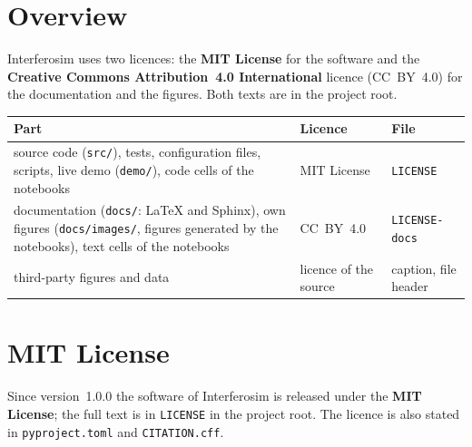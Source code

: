 \label{ch:licence}  %

\section{Overview}

Interferosim uses two licences: the \textbf{MIT License} for the
software and the \textbf{Creative Commons Attribution~4.0
International} licence (CC~BY~4.0) for the documentation and the
figures. Both texts are in the project root.\vspace{-\baselineskip}

\begin{center}
\begin{tabularx}{\linewidth}{@{}LLl@{}}
\toprule
Part & Licence & File \\
\midrule
source code (\texttt{src/}), tests, configuration files, scripts, live
  demo (\texttt{demo/}), code cells of the notebooks
  & MIT License & \texttt{LICENSE} \\
documentation (\texttt{docs/}: \LaTeX{} and Sphinx), own figures
  (\texttt{docs/images/}, figures generated by the notebooks), text
  cells of the notebooks
  & CC~BY~4.0 & \texttt{LICENSE-docs} \\
third-party figures and data & licence of the source
  & caption, file header \\
\bottomrule
\end{tabularx}
\end{center}

\section{MIT License}

Since version~1.0.0 the software of Interferosim is released under the
\textbf{MIT License}; the full text is in \texttt{LICENSE} in the project root. The
licence is also stated in \texttt{pyproject.toml} and
\texttt{CITATION.cff}.

